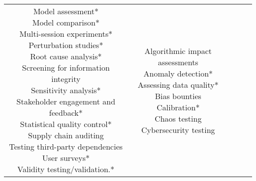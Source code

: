 \documentclass[fleqn]{article}
\begin{document}
\begin{landscape}
\begin{table}[H]
\begin{tabular}{|c|c|c|c|c|}
{			\textbullet\hspace{3pt} Model assessment*\\ 
			\textbullet\hspace{3pt} Model comparison*\\ 
			\textbullet\hspace{3pt} Multi-session experiments*\\ 
			\textbullet\hspace{3pt} Perturbation studies*\\ 
			\textbullet\hspace{3pt} Root cause analysis*\\ 
			\textbullet\hspace{3pt} Screening for information integrity \\ 
			\textbullet\hspace{3pt} Sensitivity analysis*\\ 
			\textbullet\hspace{3pt} Stakeholder engagement and feedback*\\ 
			\textbullet\hspace{3pt} Statistical quality control*\\ 
			\textbullet\hspace{3pt} Supply chain auditing \\ 
			\textbullet\hspace{3pt} Testing third-party dependencies \\
			\textbullet\hspace{3pt} User surveys*\\ 
			\textbullet\hspace{3pt} Validity testing/validation.* \\
		} 
		& \makecell[l]{
			\textbullet\hspace{3pt} Algorithmic impact assessments \\ 
			\textbullet\hspace{3pt} Anomaly detection*\\ 
			\textbullet\hspace{3pt} Assessing data quality*\\ 
			\textbullet\hspace{3pt} Bias bounties \\ 
			\textbullet\hspace{3pt} Calibration*\\ 
			\textbullet\hspace{3pt} Chaos testing \\ 
			\textbullet\hspace{3pt} Cybersecurity testing \\ 
}
\end{tabular}
\end{table}
\end{landscape}
\end{document}
